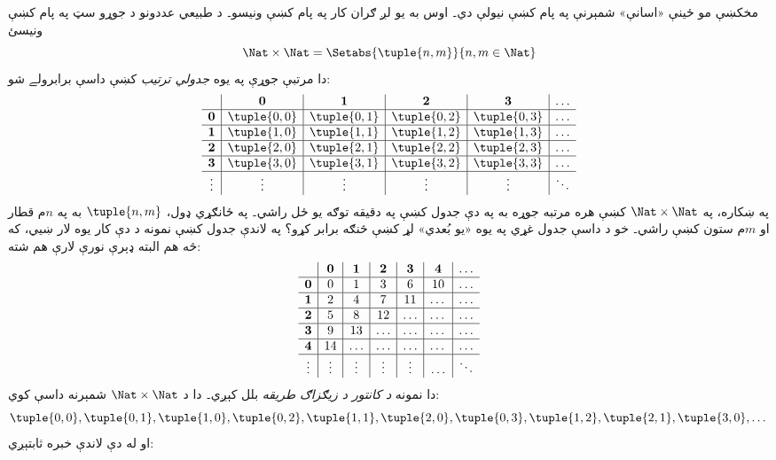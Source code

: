 \documentclass[../../../include/open-logic-section]{subfiles}
\begin{document}


\begin{explain}
مخکښې مو ځينې «اسانې» شمېرنې په پام کښې نيولې دي۔ اوس به
يو لږ ګران کار په پام کښې ونيسو۔ د طبيعي عددونو د جوړو سټ
په پام کښې ونيسئ
\[
\Nat \times \Nat = \Setabs{\tuple{n,m}}{n,m \in \Nat}
\]
دا مرتبې جوړې په يوه \emph{جدولي ترتيب} کښې داسې برابرولے شو:
\[
\begin{array}{ c | c | c | c | c | c}
& \mathbf 0 & \mathbf 1 & \mathbf 2 & \mathbf 3 & \dots \\
\hline
\mathbf 0 & \tuple{0,0} & \tuple{0,1} & \tuple{0,2} & \tuple{0,3} & \dots \\
\hline
\mathbf 1 & \tuple{1,0} & \tuple{1,1} & \tuple{1,2} & \tuple{1,3} & \dots \\
\hline
\mathbf 2 & \tuple{2,0} & \tuple{2,1} & \tuple{2,2} & \tuple{2,3} & \dots \\
\hline
\mathbf 3 & \tuple{3,0} & \tuple{3,1} & \tuple{3,2} & \tuple{3,3} & \dots \\
\hline
\vdots & \vdots & \vdots & \vdots & \vdots & \ddots\\
\end{array}
\]
په ښکاره، په $\Nat \times \Nat$ کښې هره مرتبه جوړه به په
دې جدول کښې په دقيقه توګه يو ځل راشي۔ په ځانګړي ډول،
$\tuple{n,m}$ به په $n$م قطار او $m$م ستون کښې راشي۔ خو د
داسې جدول غړي په يوه «يو بُعدي» لړ کښې څنګه برابر کړو؟ په
لاندې جدول کښې نمونه د دې کار يوه لار ښيي، که څه هم البته
ډېرې نورې لارې هم شته:
\[
\begin{array}{ c | c | c | c | c | c | c}
& \mathbf 0 & \mathbf 1 & \mathbf 2 & \mathbf 3 & \mathbf 4 &\dots \\
\hline
\mathbf 0 & 0  & 1& 3 & 6& 10 &\ldots \\
\hline
\mathbf 1 &2 & 4& 7 & 11 & \dots &\ldots \\
\hline
\mathbf 2 & 5 & 8 & 12 & \ldots & \dots&\ldots \\
\hline
\mathbf 3 & 9 & 13 & \ldots & \ldots & \dots & \ldots \\
\hline
\mathbf 4 & 14 & \ldots & \ldots & \ldots & \dots & \ldots \\
\hline
\vdots & \vdots & \vdots & \vdots & \vdots&\ldots & \ddots\\
\end{array}
\]\noindent
دا نمونه \emph{د کانتور د زيګزاګ طريقه} بلل کېږي۔ دا د
$\Nat \times \Nat$ شمېرنه داسې کوي:
\[
\tuple{0,0}, \tuple{0,1}, \tuple{1,0}, \tuple{0,2}, \tuple{1,1},
\tuple{2,0}, \tuple{0,3}, \tuple{1,2}, \tuple{2,1}, \tuple{3,0}, \dots
\]
او له دې لاندې خبره ثابتېږي:
\end{explain}
\end{document}
